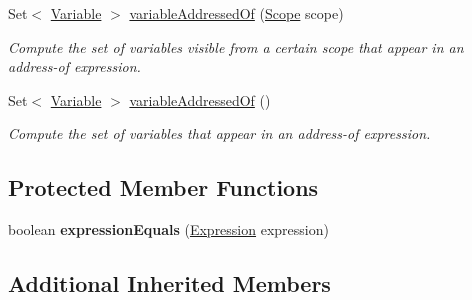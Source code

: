 \begin{DoxyCompactItemize}
\item 
Set$<$ \hyperlink{interfaceedu_1_1udel_1_1cis_1_1vsl_1_1civl_1_1model_1_1IF_1_1variable_1_1Variable}{Variable} $>$ \hyperlink{classedu_1_1udel_1_1cis_1_1vsl_1_1civl_1_1model_1_1common_1_1expression_1_1CommonBoundVariableExpression_a1b7e27c8f181dbfc5c08a04909c45779}{variable\+Addressed\+Of} (\hyperlink{interfaceedu_1_1udel_1_1cis_1_1vsl_1_1civl_1_1model_1_1IF_1_1Scope}{Scope} scope)
\begin{DoxyCompactList}\small\item\em Compute the set of variables visible from a certain scope that appear in an address-\/of expression. \end{DoxyCompactList}\item 
Set$<$ \hyperlink{interfaceedu_1_1udel_1_1cis_1_1vsl_1_1civl_1_1model_1_1IF_1_1variable_1_1Variable}{Variable} $>$ \hyperlink{classedu_1_1udel_1_1cis_1_1vsl_1_1civl_1_1model_1_1common_1_1expression_1_1CommonBoundVariableExpression_acbbb03d7864dead79a345d466da41432}{variable\+Addressed\+Of} ()
\begin{DoxyCompactList}\small\item\em Compute the set of variables that appear in an address-\/of expression. \end{DoxyCompactList}\end{DoxyCompactItemize}
\subsection*{Protected Member Functions}
\begin{DoxyCompactItemize}
\item 
\hypertarget{classedu_1_1udel_1_1cis_1_1vsl_1_1civl_1_1model_1_1common_1_1expression_1_1CommonBoundVariableExpression_a2fbc598c15440d6ab46c5b7784981377}{}boolean {\bfseries expression\+Equals} (\hyperlink{interfaceedu_1_1udel_1_1cis_1_1vsl_1_1civl_1_1model_1_1IF_1_1expression_1_1Expression}{Expression} expression)\label{classedu_1_1udel_1_1cis_1_1vsl_1_1civl_1_1model_1_1common_1_1expression_1_1CommonBoundVariableExpression_a2fbc598c15440d6ab46c5b7784981377}

\end{DoxyCompactItemize}
\subsection*{Additional Inherited Members}


